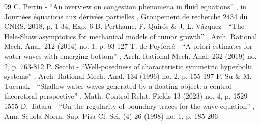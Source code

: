 \documentclass[11pt]{article}
\theoremstyle{definition}
\begin{document}
\begin{thebibliography}{99}
 C. Perrin - “An overview on congestion phenomena in fluid equations” , in Journées équations aux dérivées partielles , Groupement de recherche 2434 du CNRS, 2018, p. 1-34, Exp. 6
 B. Perthame, F. Quirós \& J. L. Vázquez - “The Hele-Shaw asymptotics for mechanical models of tumor growth” , Arch. Rational Mech. Anal. 212 (2014) no. 1, p. 93-127
 T. de Poyferré - “A priori estimates for water waves with emerging bottom” , Arch. Rational Mech. Anal. 232 (2019) no. 2, p. 763-812
 P. Secchi - “Well-posedness of characteristic symmetric hyperbolic systems” , Arch. Rational Mech. Anal. 134 (1996) no. 2, p. 155-197
 P. Su \& M. Tucsnak - “Shallow water waves generated by a floating object: a control theoretical perspective” , Math. Control Relat. Fields 13 (2023) no. 4, p. 1529-1555
 D. Tataru - “On the regularity of boundary traces for the wave equation” , Ann. Scuola Norm. Sup. Pisa Cl. Sci. (4) 26 (1998) no. 1, p. 185-206
\end{thebibliography}
\end{document}
